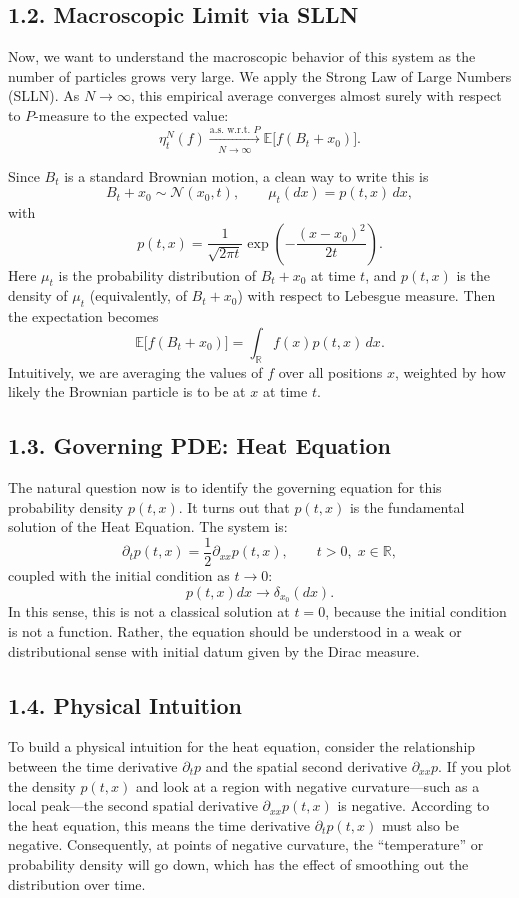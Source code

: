 \documentclass[11pt]{article}
\theoremstyle{definition}
\theoremstyle{remark}
\begin{document}
\subsection*{1.2. Macroscopic Limit via SLLN}
Now, we want to understand the macroscopic behavior of this system as the number of particles grows very large. We apply the Strong Law of Large Numbers (SLLN). As $N\to\infty$, this empirical average converges almost surely with respect to $P$-measure to the expected value:
\[
\eta_t^N(f)\xrightarrow[N\to\infty]{\text{a.s. w.r.t. }P}\mathbb{E}\bigl[f(B_t+x_0)\bigr].
\]

Since $B_t$ is a standard Brownian motion, a clean way to write this is
\[
B_t+x_0\sim \mathcal N(x_0,t),\qquad \mu_t(dx)=p(t,x)\,dx,
\]
with
\[
p(t,x)=\frac{1}{\sqrt{2\pi t}}\exp\!\left(-\frac{(x-x_0)^2}{2t}\right).
\]
Here $\mu_t$ is the probability distribution of $B_t+x_0$ at time $t$, and $p(t,x)$ is the density of $\mu_t$ (equivalently, of $B_t+x_0$) with respect to Lebesgue measure.
Then the expectation becomes
\[
\mathbb{E}\bigl[f(B_t+x_0)\bigr]=\int_{\mathbb{R}} f(x)p(t,x)\,dx.
\]
Intuitively, we are averaging the values of $f$ over all positions $x$, weighted by how likely the Brownian particle is to be at $x$ at time $t$.

\subsection*{1.3. Governing PDE: Heat Equation}
The natural question now is to identify the governing equation for this probability density $p(t,x)$. It turns out that $p(t,x)$ is the fundamental solution of the Heat Equation. The system is:
\[
\partial_t p(t,x)=\frac{1}{2}\partial_{xx}p(t,x),\qquad t>0,\;x\in\mathbb{R},
\]
coupled with the initial condition as $t\to0$:
\[
p(t,x)dx\to\delta_{x_0}(dx).
\]
In this sense, this is not a classical solution at $t=0$, because the initial condition is not a function. Rather, the equation should be understood in a weak or distributional sense with initial datum given by the Dirac measure.

\subsection*{1.4. Physical Intuition}
To build a physical intuition for the heat equation, consider the relationship between the time derivative $\partial_t p$ and the spatial second derivative $\partial_{xx}p$. If you plot the density $p(t,x)$ and look at a region with negative curvature---such as a local peak---the second spatial derivative $\partial_{xx}p(t,x)$ is negative. According to the heat equation, this means the time derivative $\partial_t p(t,x)$ must also be negative. Consequently, at points of negative curvature, the ``temperature'' or probability density will go down, which has the effect of smoothing out the distribution over time.
\end{document}
